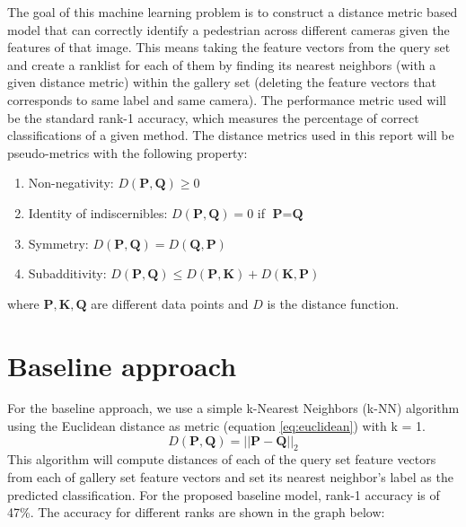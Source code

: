 \documentclass[letterpaper, 10 pt, conference]{ieeeconf}  %
\begin{document}
The goal of this machine learning problem is to construct a distance metric based model that can correctly identify a pedestrian across different cameras given the features of that image. This means taking the feature vectors from the query set and create a ranklist for each of them by finding its nearest neighbors (with a given distance metric) within the gallery set (deleting the feature vectors that corresponds to same label and same camera). The performance metric used will be the standard rank-1 accuracy, which measures the percentage of correct classifications of a given method. The distance metrics used in this report will be pseudo-metrics with the following property:
\begin{enumerate}
    \item Non-negativity: $D(\textbf{P},\textbf{Q}) \geq 0$   
    \item Identity of indiscernibles: $D(\textbf{P},\textbf{Q}) = 0$ if $\textbf{P}=\textbf{Q}$
    \item Symmetry: $D(\textbf{P},\textbf{Q}) = D(\textbf{Q},\textbf{P})$
    \item Subadditivity: $D(\textbf{P},\textbf{Q}) \leq D(\textbf{P},\textbf{K})+D(\textbf{K},\textbf{P})$
\end{enumerate}
where $\textbf{P}, \textbf{K}, \textbf{Q}$ are different data points and $D$ is the distance function. 


\section{Baseline approach}

For the baseline approach, we use a simple k-Nearest Neighbors (k-NN) algorithm using the Euclidean distance as metric (equation \ref{eq:euclidean}) with k = 1. 
\begin{equation}
    D(\textbf{P},\textbf{Q}) = ||\textbf{P}-\textbf{Q}||_2
    \label{eq:euclidean}
\end{equation}
This algorithm will compute distances of each of the query set feature vectors from each of gallery set feature vectors and set its nearest neighbor's label as the predicted classification. For the proposed baseline model, rank-1 accuracy is of 47\%. The accuracy for different ranks are shown in the graph below:
\end{document}
